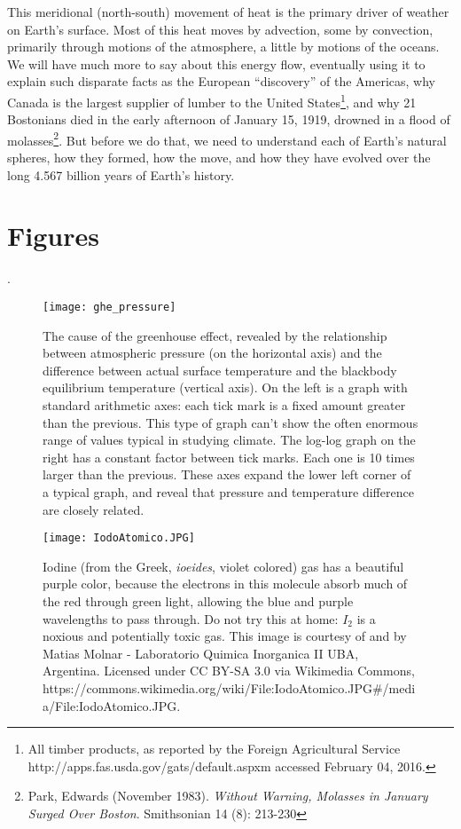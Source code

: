 This meridional (north-south) movement of heat is the primary driver of weather on Earth's surface. Most of this heat moves by advection, some by convection, primarily through motions of the atmosphere, a little by motions of the oceans. We will have much more to say about this energy flow, eventually using it to explain such disparate facts as the European ``discovery'' of the Americas, why Canada is the largest supplier of lumber to the United States\footnote{All timber products, as reported by the Foreign Agricultural Service  http://apps.fas.usda.gov/gats/default.aspxm accessed February 04, 2016.}, and why 21 Bostonians died in the early afternoon of January 15, 1919, drowned in a flood of molasses\footnote{Park, Edwards (November 1983). \textit{Without Warning, Molasses in January Surged Over Boston}. Smithsonian 14 (8): 213-230}. But before we do that, we need to understand each of Earth's natural spheres, how they formed, how the move, and how they have evolved over the long 4.567 billion years of Earth's history. 

\section{Figures}
.
\newpage

\begin{figure}[p]
\centering
\texttt{[image: ghe\_pressure]}%
\caption{The cause of the greenhouse effect, revealed by the relationship between atmospheric pressure (on the horizontal axis) and the difference between actual surface temperature and the blackbody equilibrium temperature (vertical axis). On the left is a graph with standard arithmetic axes: each tick mark is a fixed amount greater than the previous. This type of graph can't show the often enormous range of values typical in studying climate. The log-log graph on the right has a constant factor between tick marks. Each one is 10 times larger than the previous. These axes expand the lower left corner of a typical graph, and reveal that pressure and temperature difference are closely related. }   
\label{fig:tghe_P}
\end{figure}

\begin{figure}[p]
\centering
\texttt{[image: IodoAtomico.JPG]}
\caption{Iodine (from the Greek, \textit{ioeides}, violet colored) gas has a beautiful purple color, because the electrons in this molecule absorb much of the red through green light, allowing the blue and purple wavelengths to pass through. Do not try this at home: $I_2$ is a noxious and potentially toxic gas. This image is courtesy of and by Matias Molnar - Laboratorio Quimica Inorganica II UBA, Argentina. Licensed under CC BY-SA 3.0 via Wikimedia Commons,  https://commons.wikimedia.org/wiki/File:IodoAtomico.JPG\#/media/File:IodoAtomico.JPG.}   
\label{fig:iodine}
\end{figure}

